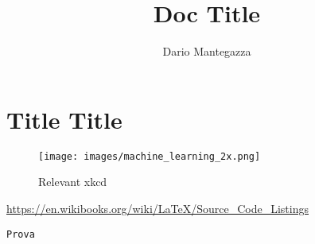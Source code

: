 \documentclass[12pt,a4paper]{article}
\author{Dario Mantegazza}
\title{Doc Title}
\begin{document}
\maketitle
\newpage
\tableofcontents
\newpage
\section{Title Title}
\begin{figure}[h]
\centering
\texttt{[image: images/machine\_learning\_2x.png]}
\caption{Relevant xkcd}
\label{fig:xkcd}	
\end{figure}
\url{https://en.wikibooks.org/wiki/LaTeX/Source_Code_Listings}
\begin{lstlisting}
Prova
\end{lstlisting}
\end{document}
